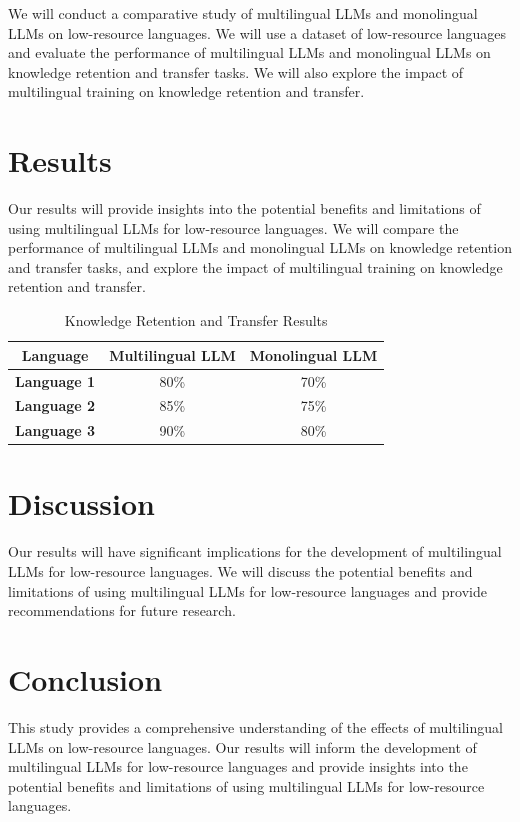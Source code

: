\documentclass{article}
\begin{document}
We will conduct a comparative study of multilingual LLMs and monolingual LLMs on low-resource languages. We will use a dataset of low-resource languages and evaluate the performance of multilingual LLMs and monolingual LLMs on knowledge retention and transfer tasks. We will also explore the impact of multilingual training on knowledge retention and transfer.

\section{Results}

Our results will provide insights into the potential benefits and limitations of using multilingual LLMs for low-resource languages. We will compare the performance of multilingual LLMs and monolingual LLMs on knowledge retention and transfer tasks, and explore the impact of multilingual training on knowledge retention and transfer.

\begin{table}[h]
\centering
\begin{tabular}{|c|c|c|}
\hline
\textbf{Language} & \textbf{Multilingual LLM} & \textbf{Monolingual LLM} \\ \hline
\textbf{Language 1} & 80\% & 70\% \\ \hline
\textbf{Language 2} & 85\% & 75\% \\ \hline
\textbf{Language 3} & 90\% & 80\% \\ \hline
\end{tabular}
\caption{Knowledge Retention and Transfer Results}
\end{table}

\section{Discussion}

Our results will have significant implications for the development of multilingual LLMs for low-resource languages. We will discuss the potential benefits and limitations of using multilingual LLMs for low-resource languages and provide recommendations for future research.

\section{Conclusion}

This study provides a comprehensive understanding of the effects of multilingual LLMs on low-resource languages. Our results will inform the development of multilingual LLMs for low-resource languages and provide insights into the potential benefits and limitations of using multilingual LLMs for low-resource languages.
\end{document}
